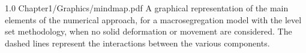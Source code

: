 \begin{figureth}
{1.0}
{Chapter1/Graphics/mindmap.pdf}
{A graphical representation of the main elements of the numerical approach, 
for a macrosegregation model with the level set methodology, 
when no solid deformation or movement are considered. 
The dashed lines represent the interactions between the various components.}
\label{fig:mindmap}
\end{figureth}









